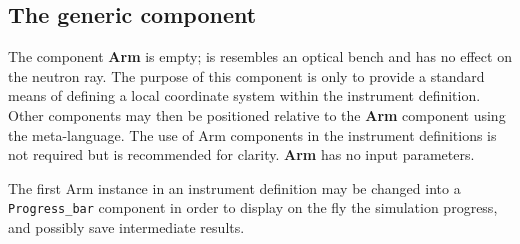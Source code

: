 \subsection*{The generic component}
\label{explain:arm}

The component \textbf{Arm} is empty; is resembles an optical bench
and has no effect on the neutron ray.
The purpose of this component is only to provide a standard
means of defining a local coordinate system within the instrument definition.
Other components may then be
positioned relative to the \textbf{Arm} component
using the \MCS meta-language.
The use of \textrm{Arm} components in the instrument definitions
is not required but is recommended for clarity.
\textbf{Arm} has no input parameters.

The first Arm instance in an instrument definition may be changed into a \verb+Progress_bar+ component in order to display on the fly the simulation progress, and possibly save intermediate results.
